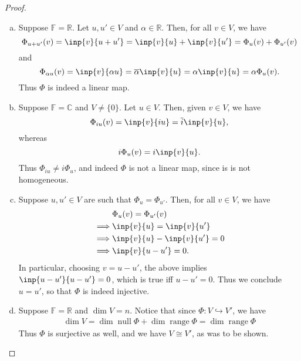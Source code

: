 \documentclass{extarticle}
\newcommand{\R}{\mathbb{R}}
\newcommand{\C}{\mathbb{C}}
\newcommand{\F}{\mathbb{F}}
\DeclareMathOperator{\Null}{null}
\DeclareMathOperator{\Range}{range}
\begin{document}
\begin{proof}
\begin{enumerate}[(a)]
\item Suppose $\F=\R$.  Let $u, u'\in V$ and $\alpha\in\R$.  Then, for all $v\in V$, we have
\begin{equation*}
\Phi_{u + u'}(v) = \inp{v}{u + u'} = \inp{v}{u} + \inp{v}{u'} = \Phi_u(v) + \Phi_{u'}(v)
\end{equation*}
and 
\begin{equation*}
\Phi_{\alpha u}(v) = \inp{v}{\alpha u} = \overline{\alpha}\inp{v}{u} = \alpha\inp{v}{u} = \alpha\Phi_u(v).
\end{equation*}
Thus $\Phi$ is indeed a linear map.
\item Suppose $\F = \C$ and $V \neq \{0\}$.  Let $u\in V$.  Then, given $v\in V$, we have
\begin{equation*}
\Phi_{iu}(v) = \inp{v}{iu} = \overline{i}\inp{v}{u},
\end{equation*}
whereas
\begin{equation*}
i\Phi_u(v) = i\inp{v}{u}.
\end{equation*}
Thus $\Phi_{iu} \neq i\Phi_u$, and indeed $\Phi$ is not a linear map, since is is not homogeneous.
\item Suppose $u, u'\in V$ are such that $\Phi_u = \Phi_{u'}$.  Then, for all $v\in V$, we have
\begin{align*}
&\Phi_u(v) = \Phi_{u'}(v)\\
\implies &\inp{v}{u} = \inp{v}{u'}\\
\implies &\inp{v}{u} - \inp{v}{u'} = 0\\
\implies &\inp{v}{u - u'} = 0.
\end{align*}
In particular, choosing $v = u - u'$, the above implies $\inp{u - u'}{u - u'}=0$, which is true iff $u - u' = 0$.  Thus we conclude $u = u'$, so that $\Phi$ is indeed injective.
\item Suppose $\F = \R$ and $\dim V = n$.  Notice that since $\Phi: V\hookrightarrow V'$, we have
\begin{align*}
\dim V = \dim\Null\Phi + \dim\Range\Phi = \dim\Range\Phi
\end{align*}
Thus $\Phi$ is surjective as well, and we have $V \cong V'$, as was to be shown.  \qedhere
\end{enumerate}
\end{proof}
\end{document}
